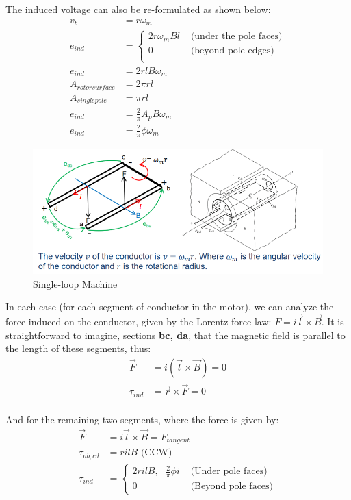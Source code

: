\documentclass{book}
\begin{document}
The induced voltage can also be re-formulated as shown below:
\begin{align*}
	v_t &= r \omega_m \\
	e_{ind} &= \begin{cases}
		2r \omega_m Bl & \text{ (under the pole faces)} \\
		0 & \text{ (beyond pole edges)} \\
	\end{cases} \\
	e_{ind} &= 2rlB\omega_m \\
	A_{rotor surface} &= 2\pi r l \\
	A_{single pole} &= \pi r l \\
	e_{ind} &= \frac{2}{\pi} A_p B \omega_m \\
	e_{ind} &= \frac{2}{\pi} \phi \omega_m
\end{align*}
\begin{figure}
	\centering
	\includegraphics[width=0.5\linewidth]{Screenshots/single_loop}
	\caption{Single-loop Machine}
	\label{fig:singleloop}
\end{figure}

In each case (for each segment of conductor in the motor), we can analyze the force induced on the conductor, given by the Lorentz force law: $F = i \vec{l}\times \vec{B}$. It is straightforward to imagine, sections \textbf{bc, da}, that the magnetic field is parallel to the length of these segments, thus:
\begin{align*}
	\vec{F} &= i(\vec{l} \times \vec{B} ) = 0 \\ 
	\tau_{ind} &= \vec{r} \times \vec{F} = 0 \\ 
\end{align*}

And for the remaining two segments, where the force is given by:
\begin{align*}
	\vec{F} &= i\vec{l} \times \vec{B} = F_{tangent} \\
	\tau_{ab, cd} &= rilB \text{ (CCW)} \\
	\tau_{ind} &=
	\begin{cases}
		2rilB, \text{ } \frac{2}{\pi}\phi i & \text{ (Under pole faces)} \\
		0 & \text{ (Beyond pole faces)}	\end{cases}
\end{align*}
\end{document}
